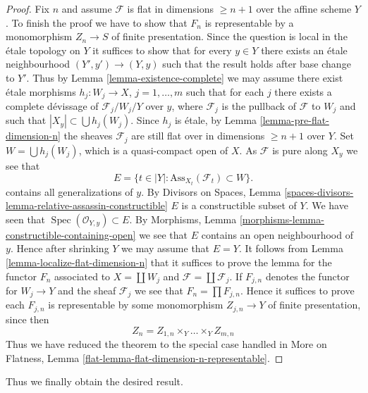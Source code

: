 \documentclass{stacks-project}
\theoremstyle{plain}
\theoremstyle{definition}
\theoremstyle{remark}
\numberwithin{equation}{subsection}
\def\Spec{\mathop{\mathrm{Spec}}}
\begin{document}
\begin{proof}
\medskip\noindent
Fix $n$ and assume $\mathcal{F}$ is flat in dimensions $\geq n + 1$
over the affine scheme $Y$.
To finish the proof we have to show that $F_n$ is representable
by a monomorphism $Z_n \to S$ of finite presentation.
Since the question is local in the \'etale topology on $Y$ it suffices to
show that for every $y \in Y$ there exists an \'etale neighbourhood
$(Y', y') \to (Y, y)$ such that the result holds after base change to $Y'$.
Thus by
Lemma \ref{lemma-existence-complete}
we may assume there exist \'etale morphisms $h_j : W_j \to X$,
$j = 1, \ldots, m$ such that for each $j$ there exists a complete
d\'evissage of $\mathcal{F}_j/W_j/Y$ over $y$,
where $\mathcal{F}_j$ is the pullback of $\mathcal{F}$ to $W_j$
and such that $|X_y| \subset \bigcup h_j(W_j)$. Since
$h_j$ is \'etale, by
Lemma \ref{lemma-pre-flat-dimension-n}
the sheaves $\mathcal{F}_j$ are still flat over in
dimensions $\geq n + 1$ over $Y$.
Set $W = \bigcup h_j(W_j)$, which is a quasi-compact open of $X$.
As $\mathcal{F}$ is pure along $X_y$ we see that
$$
E = \{t \in |Y| : \text{Ass}_{X_t}(\mathcal{F}_t) \subset W \}.
$$
contains all generalizations of $y$. By
Divisors on Spaces,
Lemma \ref{spaces-divisors-lemma-relative-assassin-constructible}
$E$ is a constructible subset of $Y$. We have seen that
$\Spec(\mathcal{O}_{Y, y}) \subset E$. By
Morphisms, Lemma \ref{morphisms-lemma-constructible-containing-open}
we see that $E$ contains an open neighbourhood of $y$.
Hence after shrinking $Y$ we may assume that $E = Y$.
It follows from
Lemma \ref{lemma-localize-flat-dimension-n}
that it suffices to prove the lemma for the functor $F_n$ associated to
$X = \coprod W_j$ and $\mathcal{F} = \coprod \mathcal{F}_j$.
If $F_{j, n}$ denotes the functor for $W_j \to Y$ and the sheaf
$\mathcal{F}_j$ we see that $F_n = \prod F_{j, n}$. Hence it suffices
to prove each $F_{j, n}$ is representable by some monomorphism
$Z_{j, n} \to Y$ of finite presentation, since then
$$
Z_n = Z_{1, n} \times_Y \ldots \times_Y Z_{m, n}
$$
Thus we have reduced the theorem to the special case handled in
More on Flatness, Lemma \ref{flat-lemma-flat-dimension-n-representable}.
\end{proof}

\noindent
Thus we finally obtain the desired result.
\end{document}
